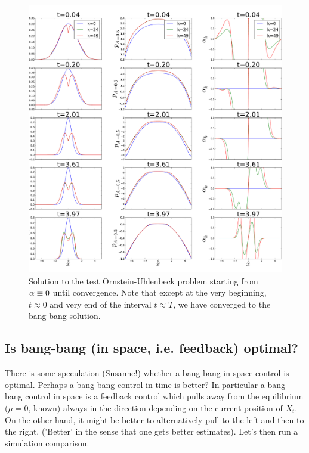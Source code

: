 \begin{figure}[htp]
\begin{center} 
  \includegraphics[width=.9\textwidth]{Figs/OUFBSolver/FB_alpha_iterates_uICs_5.pdf}
  \caption[labelInTOC]{Solution to the test Ornstein-Uhlenbeck
  problem starting from $\alpha \equiv 0$ until convergence. Note that except at the very
  beginning, $t \approx 0$ and very end of the interval $t\approx T$, we have
  converged to the bang-bang solution.}
  \label{fig:FBSoln_OU_alpha_iterations}
\end{center}
\end{figure}


\vskip15pt
\begin{center}

\end{center}

\clearpage

\subsection{Is bang-bang (in space, i.e. feedback) optimal?}
There is some speculation (Susanne!) whether a bang-bang in space control is
optimal. Perhaps a bang-bang control in time is better? In particular a bang-bang control in
space is a feedback control which pulls away from the equilibrium ($\mu=0$,
known) always in the direction depending on the current position of $X_t$. On
the other hand, it might be better to alternatively pull to the left and then to
the right. ('Better' in the sense that one gets better estimates). Let's then
run a simulation comparison. 

